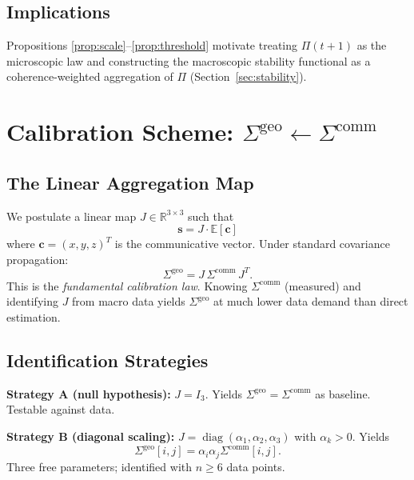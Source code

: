 \documentclass[12pt]{article}
\theoremstyle{plain}
\theoremstyle{definition}
\theoremstyle{remark}
\begin{document}
\subsection{Implications}

Propositions \ref{prop:scale}--\ref{prop:threshold} motivate treating $\Pi(t+1)$ as the microscopic law and constructing the macroscopic stability functional as a coherence-weighted aggregation of $\Pi$ (Section~\ref{sec:stability}).

\section{Calibration Scheme: $\Sigma^{\text{geo}} \leftarrow \Sigma^{\text{comm}}$}
\label{sec:calibration}

\subsection{The Linear Aggregation Map}

We postulate a linear map $J \in \mathbb{R}^{3 \times 3}$ such that
\[
\mathbf{s} = J \cdot \mathbb{E}[\mathbf{c}]
\]
where $\mathbf{c} = (x, y, z)^T$ is the communicative vector. Under standard covariance propagation:
\begin{equation}\label{eq:calib}
\Sigma^{\text{geo}} = J \, \Sigma^{\text{comm}} \, J^T.
\end{equation}
This is the \emph{fundamental calibration law}. Knowing $\Sigma^{\text{comm}}$ (measured) and identifying $J$ from macro data yields $\Sigma^{\text{geo}}$ at much lower data demand than direct estimation.

\subsection{Identification Strategies}

\textbf{Strategy A (null hypothesis):} $J = I_3$. Yields $\Sigma^{\text{geo}} = \Sigma^{\text{comm}}$ as baseline. Testable against data.

\textbf{Strategy B (diagonal scaling):} $J = \operatorname{diag}(\alpha_1, \alpha_2, \alpha_3)$ with $\alpha_k > 0$. Yields
\begin{equation}\label{eq:strategy-b}
\Sigma^{\text{geo}}[i,j] = \alpha_i \alpha_j \Sigma^{\text{comm}}[i,j].
\end{equation}
Three free parameters; identified with $n \geq 6$ data points.
\end{document}
